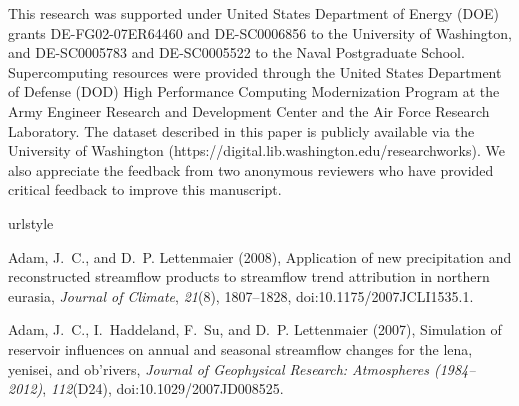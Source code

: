 \documentclass[jgrga, draft]{agutex}
\begin{document}
\begin{article}

%
%
%


\begin{acknowledgments}
This research was supported under United States Department of Energy (DOE) grants DE-FG02-07ER64460 and DE-SC0006856 to the University of Washington, and DE-SC0005783 and DE-SC0005522 to the Naval Postgraduate School.
Supercomputing resources were provided through the United States Department of Defense (DOD) High Performance Computing Modernization Program at the Army Engineer Research and Development Center and the Air Force Research Laboratory.
The dataset described in this paper is publicly available via the University of Washington (https://digital.lib.washington.edu/researchworks).
We also appreciate the feedback from two anonymous reviewers who have provided critical feedback to improve this manuscript.
\end{acknowledgments}


% 
% 
\begin{thebibliography}{79}
\providecommand{\natexlab}[1]{#1}
\expandafter\ifx\csname urlstyle\endcsname\relax
  \providecommand{\doi}[1]{doi:\discretionary{}{}{}#1}\else
  \providecommand{\doi}{doi:\discretionary{}{}{}\begingroup
  \urlstyle{rm}\Url}\fi

Adam, J.~C., and D.~P. Lettenmaier (2008), Application of new precipitation and
  reconstructed streamflow products to streamflow trend attribution in northern
  eurasia, \textit{Journal of Climate}, \textit{21}(8), 1807--1828,
  \doi{10.1175/2007JCLI1535.1}.

Adam, J.~C., I.~Haddeland, F.~Su, and D.~P. Lettenmaier (2007), Simulation of
  reservoir influences on annual and seasonal streamflow changes for the lena,
  yenisei, and ob'rivers, \textit{Journal of Geophysical Research: Atmospheres
  (1984--2012)}, \textit{112}(D24), \doi{10.1029/2007JD008525}.


\end{thebibliography}
\end{article}
\end{document}
